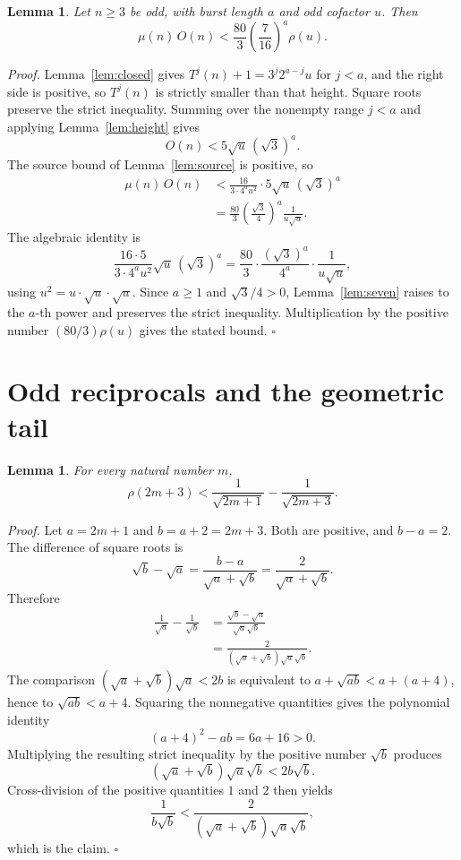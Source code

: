 \documentclass[11pt,letterpaper]{article}
\newtheorem{lemma}[theorem]{Lemma}
\newenvironment{proof}{\noindent\textit{Proof.}}{\hfill\(\square\)}
\begin{document}
\begin{lemma}
\label{lem:one}
Let \(n\ge 3\) be odd, with burst length \(a\) and odd cofactor \(u\). Then
\[
\mu(n)\,O(n)
<\frac{80}{3}\left(\frac{7}{16}\right)^{a}\rho(u).
\]
\end{lemma}

\begin{proof}
Lemma~\ref{lem:closed} gives \(T^{j}(n)+1=3^{j}2^{a-j}u\) for \(j<a\), and the right side is positive, so \(T^{j}(n)\) is strictly smaller than that height. Square roots preserve the strict inequality. Summing over the nonempty range \(j<a\) and applying Lemma~\ref{lem:height} gives
\[
O(n)<5\sqrt{u}\,(\sqrt{3})^{a}.
\]
The source bound of Lemma~\ref{lem:source} is positive, so
\begin{align*}
\mu(n)\,O(n)
&<\frac{16}{3\cdot 4^{a}u^{2}}\cdot 5\sqrt{u}\,(\sqrt{3})^{a}\\
&=\frac{80}{3}\left(\frac{\sqrt{3}}{4}\right)^{a}\frac{1}{u\sqrt{u}}.
\end{align*}
The algebraic identity is
\[
\frac{16\cdot 5}{3\cdot 4^{a}u^{2}}\sqrt{u}\,(\sqrt{3})^{a}
=\frac{80}{3}\cdot\frac{(\sqrt{3})^{a}}{4^{a}}\cdot\frac{1}{u\sqrt{u}},
\]
using \(u^{2}=u\cdot\sqrt{u}\cdot\sqrt{u}\). Since \(a\ge 1\) and \(\sqrt{3}/4>0\), Lemma~\ref{lem:seven} raises to the \(a\)-th power and preserves the strict inequality. Multiplication by the positive number \((80/3)\rho(u)\) gives the stated bound.
\end{proof}

\section{Odd reciprocals and the geometric tail}

\begin{lemma}
\label{lem:gap}
For every natural number \(m\),
\[
\rho(2m+3)
<\frac{1}{\sqrt{2m+1}}-\frac{1}{\sqrt{2m+3}}.
\]
\end{lemma}

\begin{proof}
Let \(a=2m+1\) and \(b=a+2=2m+3\). Both are positive, and \(b-a=2\). The difference of square roots is
\[
\sqrt{b}-\sqrt{a}=\frac{b-a}{\sqrt{a}+\sqrt{b}}=\frac{2}{\sqrt{a}+\sqrt{b}}.
\]
Therefore
\begin{align*}
\frac{1}{\sqrt{a}}-\frac{1}{\sqrt{b}}
&=\frac{\sqrt{b}-\sqrt{a}}{\sqrt{a}\sqrt{b}}\\
&=\frac{2}{(\sqrt{a}+\sqrt{b})\sqrt{a}\sqrt{b}}.
\end{align*}
The comparison \((\sqrt{a}+\sqrt{b})\sqrt{a}<2b\) is equivalent to \(a+\sqrt{ab}<a+(a+4)\), hence to \(\sqrt{ab}<a+4\). Squaring the nonnegative quantities gives the polynomial identity
\[
(a+4)^{2}-ab=6a+16>0.
\]
Multiplying the resulting strict inequality by the positive number \(\sqrt{b}\) produces
\[
(\sqrt{a}+\sqrt{b})\sqrt{a}\sqrt{b}<2b\sqrt{b}.
\]
Cross-division of the positive quantities \(1\) and \(2\) then yields
\[
\frac{1}{b\sqrt{b}}
<\frac{2}{(\sqrt{a}+\sqrt{b})\sqrt{a}\sqrt{b}},
\]
which is the claim.
\end{proof}
\end{document}
